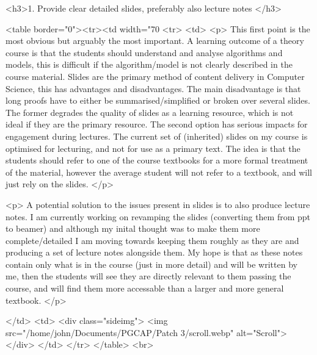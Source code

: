 <h3>1. Provide clear detailed slides, preferably also lecture notes </h3>

<table border="0"><tr><td width="70%
<tr>
<td>
<p> This first point is the most obvious but arguably the most important. A learning outcome of a theory course is that the students should understand and analyse algorithms and models, this is difficult if the algorithm/model is not clearly described in the course material. Slides are the primary method of content delivery in Computer Science, this has advantages and disadvantages. The main disadvantage is that long proofs have to either be summarised/simplified or broken over several slides. The former degrades the quality of slides as a learning resource, which is not ideal if they are the primary resource. The second option has serious impacts for engagement during lectures. The current set of (inherited) slides on my course is optimised for lecturing, and not for use as a primary text. The idea is that the students should refer to one of the course textbooks for a more formal treatment of the material, however the average student will not refer to a textbook, and will just rely on the slides.
</p>

<p>  A potential solution to the issues present in slides is to also produce lecture notes. I am currently working on revamping the slides (converting them from ppt to beamer) and although my inital thought was to make them more complete/detailed I am moving towards keeping them roughly as they are and producing a set of lecture notes alongside them. My hope is that as these notes contain only what is in the course (just in more detail) and will be written by me, then the students will see they are directly relevant to them passing the course, and will find them more accessable than a larger and more general textbook.
</p>

</td>
<td>  <div class="sideimg">
<img  src="/home/john/Documents/PGCAP/Patch 3/scroll.webp" alt="Scroll">
</div>
</td>
</tr>
</table>
<br>
